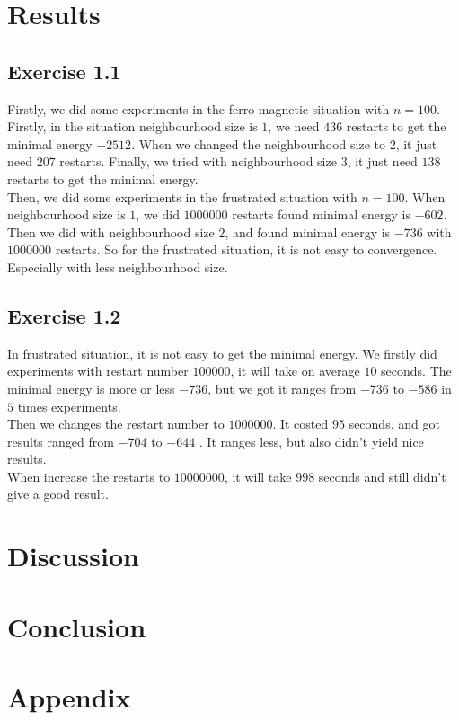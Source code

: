 \documentclass[10pt,a4paper]{article}
\begin{document}
\section{Results}
\subsection{Exercise 1.1}
Firstly, we did some experiments in the ferro-magnetic situation with $n=100$. Firstly, in the situation neighbourhood size is $1$, we need $436$ restarts to get the minimal energy $-2512$. When we changed the neighbourhood size to $2$, it just need $207$ restarts. Finally, we tried with neighbourhood size $3$, it just need $138$ restarts to get the minimal energy.\\
Then, we did some experiments in the frustrated situation with $n=100$. When neighbourhood size is $1$, we did $1000000$ restarts found minimal energy is $-602$. Then we did with neighbourhood size $2$, and found minimal energy is $-736$ with $1000000$ restarts. So for the frustrated situation, it is not easy to convergence. Especially with less neighbourhood size.
\subsection{Exercise 1.2}
In frustrated situation, it is not easy to get the minimal energy.
We firstly did experiments with restart number $100000$, it will take on average $10$ seconds. The minimal energy is more or less $-736$, but we got it ranges from $-736$ to $-586$ in $5$ times experiments.\\
Then we changes the restart number to $1000000$. It costed $95$ seconds, and got results ranged from $-704$ to $-644$ . It ranges less, but also didn't yield nice results. \\
When increase the restarts to $10000000$, it will take $998$ seconds and still didn't give a good result.

\section{Discussion}

\section{Conclusion}

\newpage
\section{Appendix}
\end{document}
